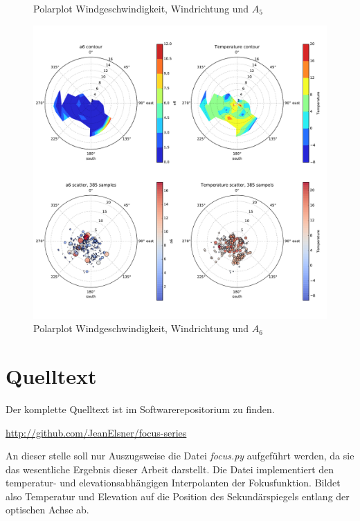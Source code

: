 \begin{appendix}
\begin{figure}[H]
	\caption[Polarplot Windgeschwindigkeit, Windrichtung und $A_5$]{Polarplot Windgeschwindigkeit, Windrichtung und $A_5$}
    \label{wind_a5}
\end{figure}
\begin{figure}[H]
	\centering
	\includegraphics[scale=.46]{wind/wind_a6}
	\caption[Polarplot Windgeschwindigkeit, Windrichtung und $A_6$]{Polarplot Windgeschwindigkeit, Windrichtung und $A_6$}
    \label{wind_a6}
\end{figure}

\chapter{Quelltext}
Der komplette Quelltext ist im Softwarerepositorium zu finden.
\begin{mdframed}[style=emphasis]
	\centering
	\url{http://github.com/JeanElsner/focus-series}
\end{mdframed}
An dieser stelle soll nur Auszugsweise die Datei \emph{focus.py} aufgeführt werden, da sie das wesentliche Ergebnis dieser Arbeit darstellt. Die Datei implementiert den temperatur- und elevationsabhängigen Interpolanten der Fokusfunktion. Bildet also Temperatur und Elevation auf die Position des Sekundärspiegels entlang der optischen Achse ab.



\end{appendix}
